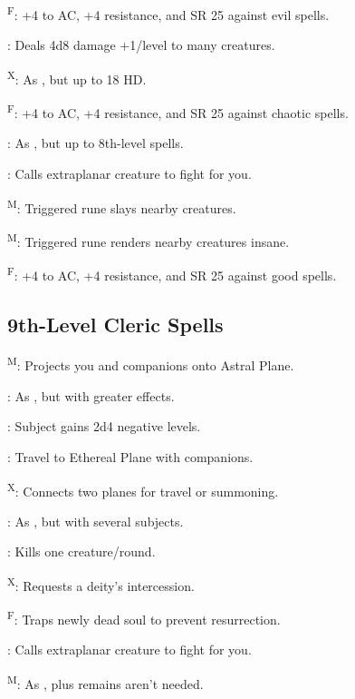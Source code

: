 

\textsuperscript{F}: +4 to AC, +4 resistance, and SR 25 against evil spells.

: Deals 4d8 damage +1/level to many creatures.

\textsuperscript{X}: As , but up to 18 HD.

\textsuperscript{F}: +4 to AC, +4 resistance, and SR 25 against chaotic spells.

: As , but up to 8th-level spells.

: Calls extraplanar creature to fight for you.

\textsuperscript{M}: Triggered rune slays nearby creatures.

\textsuperscript{M}: Triggered rune renders nearby creatures insane.

\textsuperscript{F}: +4 to AC, +4 resistance, and SR 25 against good spells.



\subsection{9th-Level Cleric Spells}

\textsuperscript{M}: Projects you and companions onto Astral Plane.

: As , but with greater effects. %

: Subject gains 2d4 negative levels.

: Travel to Ethereal Plane with companions.

\textsuperscript{X}: Connects two planes for travel or summoning.

: As , but with several subjects.

: Kills one creature/round.

\textsuperscript{X}: Requests a deity's intercession.

\textsuperscript{F}: Traps newly dead soul to prevent resurrection.


: Calls extraplanar creature to fight for you.

\textsuperscript{M}: As , plus remains aren't needed.

